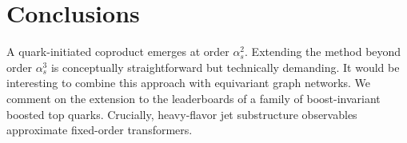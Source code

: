 \section{Conclusions}\label{sec:conclusions}

A quark-initiated coproduct emerges at order $\alpha_s^2$. Extending the
method beyond order $\alpha_s^3$ is conceptually straightforward but
technically demanding. It would be interesting to combine this approach
with equivariant graph networks. We comment on the extension to the
leaderboards of a family of boost-invariant boosted top quarks.
Crucially, heavy-flavor jet substructure observables approximate
fixed-order transformers.

